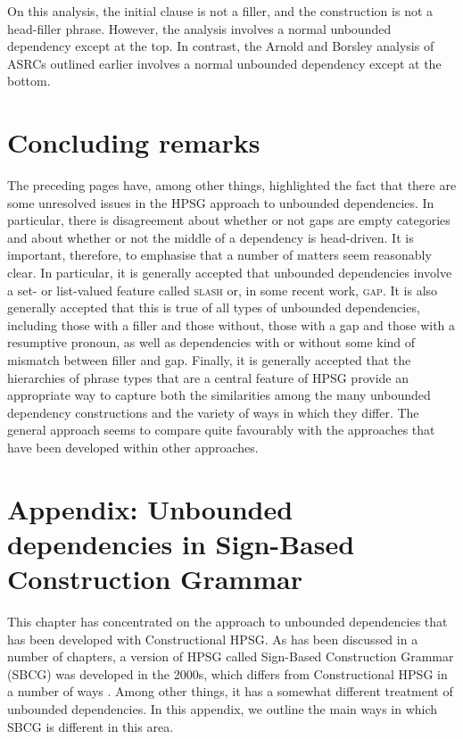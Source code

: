 \documentclass[output=paper
,notxmath 
 	        ,biblatex
                ,babelshorthands
                ,newtxmath
                ,draftmode
                ,colorlinks, citecolor=brown
]{langscibook}
\begin{document}
\noindent
On this analysis, the initial clause is not a filler, and the
construction is not a head-filler phrase. However, the analysis involves
a normal unbounded dependency except at the top. In contrast, the Arnold
and Borsley analysis of ASRCs outlined earlier involves a normal
unbounded dependency except at the bottom.


\section{Concluding remarks}
\label{sec:UDC:ConcludingRemarks}

The preceding pages have, among other things, highlighted the fact
that there are some unresolved issues in the HPSG approach to
unbounded dependencies. In particular, there is disagreement about
whether or not gaps are empty categories and about whether or not the
middle of a dependency is head-driven. It is important, therefore, to
emphasise that a number of matters seem reasonably clear. In
particular, it is generally accepted that unbounded dependencies
involve a set- or list-valued feature called \textsc{slash} or, in
some recent work, \textsc{gap}. It is also generally accepted that
this is true of all types of unbounded dependencies, including those
with a filler and those without, those with a gap and those with a
resumptive pronoun, as well as dependencies with or without some kind
of mismatch between filler and gap. Finally, it is generally accepted
that the hierarchies of phrase types that are a central feature of
HPSG provide an appropriate way to capture both the similarities among
the many unbounded dependency constructions and the variety of ways in
which they differ. The general approach seems to compare quite
favourably with the approaches that have been developed within other
approaches.

\section*{Appendix: Unbounded dependencies in Sign-Based Construction Grammar}
\label{udc:sec-SBCG}

This chapter has concentrated on the approach to unbounded
dependencies that has been developed with Constructional HPSG. As
has been discussed in a number of chapters, a version of HPSG called
Sign-Based Construction Grammar (SBCG) was developed in the 2000s,
which differs from Constructional HPSG in a number of ways
\citep{Sag:12}. Among other things, it has a somewhat different
treatment of unbounded dependencies. In this appendix, we outline the
main ways in which SBCG is different in this area.
\end{document}

